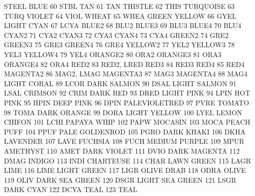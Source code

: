         STEEL BLUE         60       STBL
        TAN                61       TAN
        THISTLE            62       THIS
        TURQUOISE          63       TURQ
        VIOLET             64       VIOL
        WHEAT              65       WHEA
        GREEN YELLOW       66       GYEL
        LIGHT CYAN         67       LCYA
        BLUE2              68       BLU2
        BLUE3              69       BLU3
        BLUE4              70       BLU4
        CYAN2              71       CYA2
        CYAN3              72       CYA3
        CYAN4              73       CYA4
        GREEN2             74       GRE2
        GREEN3             75       GRE3
        GREEN4             76       GRE4
        YELLOW2            77       YEL2
        YELLOW3            78       YEL3
        YELLOW4            79       YEL4
        ORANGE2            80       ORA2
        ORANGE3            81       ORA3
        ORANGE4            82       ORA4
        RED2               83       RED2, LRED
        RED3               84       RED3
        RED4               85       RED4
        MAGENTA2           86       MAG2, LMAG
        MAGENTA3           87       MAG3
        MAGENTA4           88       MAG4
        LIGHT CORAL        89       LCOR
        DARK SALMON        90       DSAL
        LIGHT SALMON       91       LSAL
        CRIMSON            92       CRIM
        DARK RED           93       DRED
        LIGHT PINK         94       LPIN
        HOT PINK           95       HPIN
        DEEP PINK          96       DPIN
        PALEVIOLETRED      97       PVRE
        TOMATO             98       TOMA
        DARK ORANGE        99       DORA
        LIGHT YELLOW      100       LYEL
        LEMON CHIFON      101       LCHI
        PAPAYA WHIP       102       PAPW
        MOCASIN           103       MOCA
        PEACH PUFF        104       PPUF
        PALE GOLDENROD    105       PGRO
        DARK KHAKI        106       DKHA
        LAVENDER          107       LAVE
        FUCHSIA           108       FUCH
        MEDIUM PURPLE     109       MPUR
        AMETHYST          110       AMET
        DARK VIOLET       111       DVIO
        DARK MAGENTA      112       DMAG
        INDIGO            113       INDI
        CHARTEUSE         114       CHAR
        LAWN GREEN        115       LAGR
        LIME              116       LIME
        LIGHT GREEN       117       LIGR
        OLIVE DRAB        118       ODRA
        OLIVE             119       OLIV
        DARK SEA GREEN    120       DSGR
        LIGHT SEA GREEN   121       LSGR
        DARK CYAN         122       DCYA
        TEAL              123       TEAL
